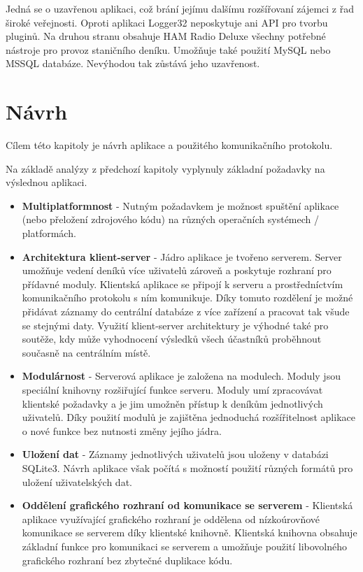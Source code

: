 Jedná se o uzavřenou aplikaci, což brání jejímu dalšímu rozšířovaní zájemci z
řad široké veřejnosti. Oproti aplikaci
Logger32 neposkytuje ani API pro tvorbu pluginů. Na druhou stranu obsahuje HAM Radio Deluxe všechny
potřebné nástroje pro provoz staničního deníku. Umožňuje také použití MySQL nebo MSSQL databáze.
Nevýhodou tak zůstává jeho uzavřenost.


\chapter{Návrh}
\label{navrh}

Cílem této kapitoly je návrh aplikace a použitého komunikačního protokolu.

Na základě analýzy z předchozí kapitoly vyplynuly základní požadavky
na výslednou aplikaci.

\begin{itemize}
\item \textbf{Multiplatformnost} - Nutným požadavkem je možnost spuštění
aplikace (nebo přeložení zdrojového kódu) na různých operačních systémech / platformách.
\item \textbf{Architektura klient-server} - Jádro aplikace je tvořeno serverem.
Server umožňuje vedení deníků více uživatelů zároveň a poskytuje rozhraní pro přídavné moduly.
Klientská aplikace se připojí k serveru a prostředníctvím komunikačního protokolu s ním komunikuje.
Díky tomuto rozdělení je možné přidávat záznamy do centrální databáze z více zařízení a pracovat
tak všude se stejnými daty. Využití klient-server architektury je výhodné také pro soutěže, kdy může vyhodnocení
výsledků všech účastníků proběhnout současně na centrálním místě.
\item \textbf{Modulárnost} - Serverová aplikace je založena na modulech. Moduly jsou speciální knihovny rozšiřující funkce
serveru. Moduly umí zpracovávat klientské požadavky a je jim umožněn přístup k deníkům jednotlivých uživatelů. Díky použití modulů
je zajištěna jednoduchá rozšířitelnost aplikace o nové funkce bez nutnosti změny jejího jádra.
\item \textbf{Uložení dat} - Záznamy jednotlivých uživatelů jsou uloženy v databázi SQLite3. Návrh aplikace
však počítá s možností použití různých formátů pro uložení uživatelských dat.
\item \textbf{Oddělení grafického rozhraní od komunikace se serverem} - Klientská aplikace využívající grafického rozhraní
je oddělena od nízkoúrovňové komunikace se serverem díky klientské knihovně. Klientská knihovna obsahuje základní funkce
pro komunikaci se serverem a umožňuje použití libovolného grafického rozhraní bez zbytečné duplikace kódu.
\end{itemize}

